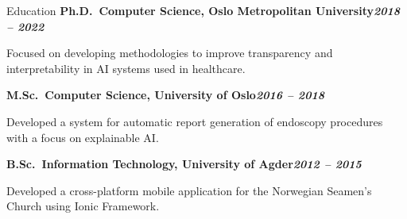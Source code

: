 \begin{rubric}{Education}
\entry*[]%
\textbf{Ph.D.~Computer Science, Oslo Metropolitan University\hfill\textit{2018 -- 2022}} \par
\begin{compactitem}
    \item Focused on developing methodologies to improve transparency and interpretability in AI systems used in healthcare.
    \vspace{-12pt}
\end{compactitem}
%
\entry*[]%
\textbf{M.Sc.~Computer Science, University of Oslo\hfill\textit{2016 -- 2018}} \par
\begin{compactitem}
    \item Developed a system for automatic report generation of endoscopy procedures with a focus on explainable AI.
    \vspace{-12pt}
\end{compactitem}
% 
\entry*[]%
\textbf{B.Sc.~Information Technology, University of Agder\hfill\textit{2012 -- 2015}} \par
\begin{compactitem}
\item Developed a cross-platform mobile application for the Norwegian Seamen's Church using Ionic Framework.
\vspace{-12pt}
\end{compactitem}
\end{rubric}